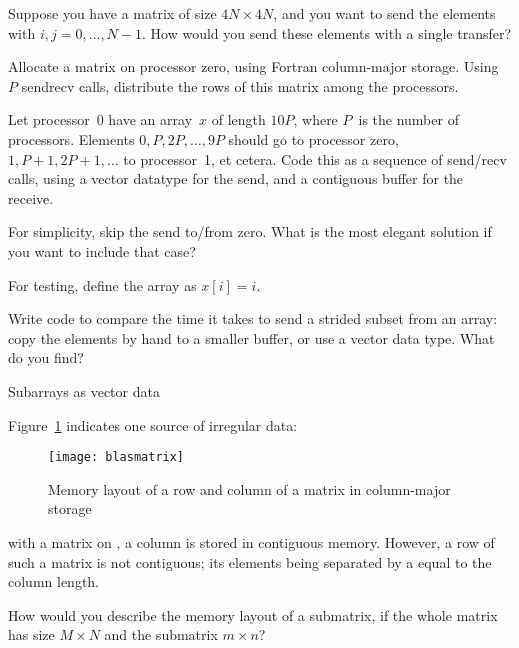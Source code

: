 \begin{exercise}
  Suppose you have a matrix of size $4N\times 4N$, and you want to
  send the elements  with $i,j=0,\ldots,N-1$. How would
  you send these elements with a single transfer?
\end{exercise}

\begin{exercise}
  \label{ex:col-to-row}
  Allocate a matrix on processor zero, using Fortran column-major storage.
  Using $P$ sendrecv calls, distribute the rows of this matrix among the
  processors.
\end{exercise}

\begin{exercise}
  \label{ex:stridesend}
  Let processor~0 have an array~$x$ of length $10P$, where $P$~is the number of processors.
  Elements $0,P,2P,\ldots,9P$ should go to processor zero, $1,P+1,2P+1,\ldots$ to processor~1,
  et cetera. Code this as a sequence of send/recv calls, using a vector datatype
  for the send, and a contiguous buffer for the receive.

  For simplicity, skip the send to/from zero. What is the most elegant
  solution if you want to include that case?

  For testing, define the array as $x[i]=i$.
\end{exercise}

\begin{exercise}
  Write code to compare the time it takes to send a strided subset
  from an array: copy the elements by hand to a smaller buffer, or use
  a vector data type. What do you find?
\end{exercise}

 {Subarrays as vector data}

Figure~\ref{fig:blasmatrix} indicates one source of irregular
data:
%
\begin{figure}[ht]
  \texttt{[image: blasmatrix]}
  \caption{Memory layout of a row and column of a matrix in column-major storage}
  \label{fig:blasmatrix}
\end{figure}
%
with a matrix on , a column is
stored in contiguous memory. However, a row of such a matrix
is not contiguous; its elements being separated by a 
equal to the column length.

\begin{exercise}
  \label{ex:submatrix}
  How would you describe the memory layout of a submatrix,
  if the whole matrix has size $M\times N$ and the submatrix $m\times n$?
\end{exercise}

